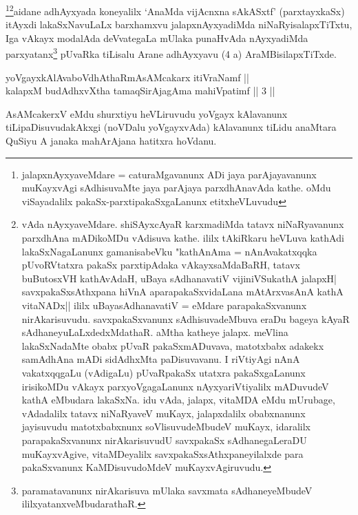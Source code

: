 \begin{artha}
\footnote{jalapxnAyxyaveMdare = caturaMgavanunx ADi jaya parAjayavanunx muKayxvAgi sAdhisuvaMte jaya parAjaya parxdhAnavAda kathe. oMdu viSayadalilx pakaSx-parxtipakaSxgaLanunx etitxheVLuvudu}\footnote{vAda nAyxyaveMdare. shiSAyxcAyaR karxmadiMda tatavx niNaRyavanunx parxdhAna mADikoMDu vAdisuva kathe. ililx tAkiRkaru heVLuva kathAdi lakaSxNagaLanunx gamanisabeVku "kathAnAma = nAnAvakatxqqka pUvoRVtatxra pakaSx parxtipAdaka vAkayxsaMdaBaRH, tatavx buButosxVH kathAvAdaH, uBaya sAdhanavatiV vijiniVSukathA jalapxH| savxpakaSxsAthxpana hiVnA aparapakaSxvidaLana mAtArxvasAnA kathA vitaNADx|| ililx uBayasAdhanavatiV = eMdare parapakaSxvanunx nirAkarisuvudu. savxpakaSxvanunx sAdhisuvadeMbuva eraDu bageya kAyaR sAdhaneyuLaLxdedxMdathaR. aMtha katheye jalapx. meVlina lakaSxNadaMte obabx pUvaR pakaSxmADuvava, matotxbabx adakekx samAdhAna mADi sidAdhxMta paDisuvavanu. I riVtiyAgi nAnA vakatxqqgaLu (vAdigaLu) pUvaRpakaSx utatxra pakaSxgaLanunx irisikoMDu vAkayx parxyoVgagaLanunx nAyxyariVtiyalilx mADuvudeV kathA eMbudara lakaSxNa. idu vAda, jalapx, vitaMDA eMdu mUrubage, vAdadalilx tatavx niNaRyaveV muKayx, jalapxdalilx obabxnanunx jayisuvudu matotxbabxnunx soVlisuvudeMbudeV muKayx, idaralilx parapakaSxvanunx nirAkarisuvudU savxpakaSx sAdhanegaLeraDU muKayxvAgive, vitaMDeyalilx savxpakaSxsAthxpaneyilalxde para pakaSxvanunx KaMDisuvudoMdeV muKayxvAgiruvudu.}aidane adhAyxyada koneyalilx `AnaMda vijAcnxna sAkASxtf' (parxtayxkaSx) itAyxdi lakaSxNavuLaLx barxhamxvu jalapxnAyxyadiMda niNaRyisalapxTiTxtu, Iga vAkayx modalAda deVvategaLa mUlaka punaHvAda nAyxyadiMda parxyatanx\footnote{paramatavanunx nirAkarisuva mUlaka savxmata sAdhaneyeMbudeV ililxyatanxveMbudarathaR.} pUvaRka tiLisalu Arane adhAyxyavu (4 a) AraMBisilapxTiTxde.
\end{artha}

\begin{shl}
yoVgayxkAlAvaboVdhAthaRmAsAMcakarx itiVraNamf || \\
kalapxM budAdhxvX\s tha tamaqSirAjagAma mahiVpatimf \hfill ||  3 ||  
\end{shl}

\begin{artha}
AsAMcakerxV eMdu shurxtiyu heVLiruvudu yoVgayx kAlavanunx tiLipaDisuvudakAkxgi (noVDalu yoVgayxvAda) kAlavanunx tiLidu anaMtara QuSiyu A janaka mahArAjana hatitxra hoVdanu.
\end{artha}


